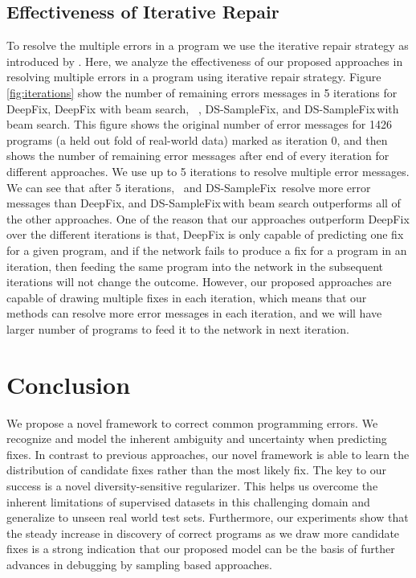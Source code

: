 \documentclass[letterpaper]{article} \usepackage{aaai20}  \usepackage{times}  \usepackage{helvet} \usepackage{courier}  \usepackage[hyphens]{url}  \usepackage{graphicx}
\newcommand{\dssmaplefix}{DS-SampleFix}
\newcommand{\figref}{Figure}
\begin{document}
\subsection{Effectiveness of Iterative Repair}
To resolve the multiple errors in a program we use the iterative repair strategy as introduced by \cite{Gupta2017DeepFixFC}. Here, we analyze the effectiveness of our proposed approaches in resolving multiple errors in a program using iterative repair strategy. \figref \,\ref{fig:iterations} show the number of remaining errors messages in 5 iterations for DeepFix, DeepFix with beam search, \samplefix \, , \dssmaplefix, and \dssmaplefix \,with beam search. This figure shows the original number of error messages for 1426 programs (a held out fold of real-world data) marked as iteration 0, and then shows the number of remaining error messages after end of every iteration for different approaches. We use up to 5 iterations to resolve multiple error messages. We can see that after 5 iterations, \samplefix \, and \dssmaplefix \, resolve more error messages than DeepFix, and \dssmaplefix \,with beam search outperforms all of the other approaches. One of the reason that our approaches outperform DeepFix over the different iterations is that, DeepFix is only capable of predicting one fix for a given program, and if the network fails to produce a fix for a program in an iteration, then feeding the same program into the network in the subsequent iterations will not change the outcome. However, our proposed approaches are capable of drawing multiple fixes in each iteration, which means that our methods can resolve more error messages in each iteration, and we will have larger number of programs to feed it to the network in next iteration. 


\section{Conclusion}
We propose a novel framework to correct common programming errors. We recognize and model the inherent ambiguity and uncertainty when predicting fixes. In contrast to previous approaches, our novel framework is able to learn the distribution of candidate fixes rather than the most likely fix. The key to our success is a novel diversity-sensitive regularizer. This helps us overcome the inherent limitations of supervised datasets in this challenging domain  and generalize to unseen real world test sets. Furthermore, our experiments show that the steady increase in discovery of correct programs as we draw more candidate fixes is a strong indication that our proposed model can be the basis of further advances in debugging by sampling based approaches.
\end{document}

